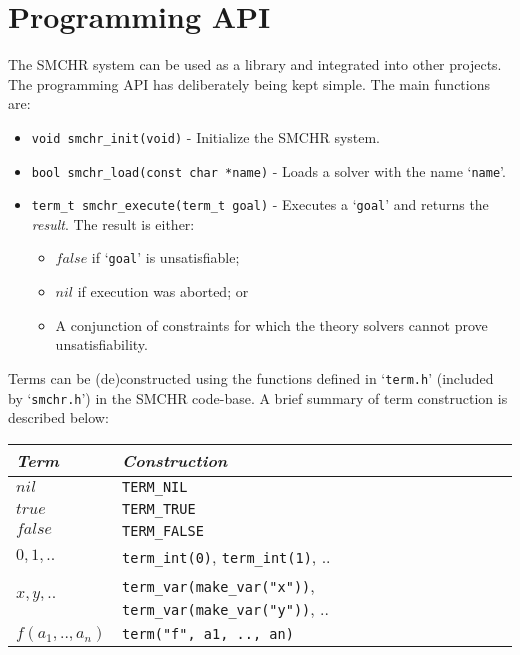 \documentclass{article}
\begin{document}
\section{Programming API}

The SMCHR system can be used as a library and integrated into other projects.
The programming API has deliberately being kept simple.
The main functions are:
\begin{itemize}[noitemsep,topsep=0pt,parsep=0pt,partopsep=0pt]
\item \verb+void smchr_init(void)+ -
    Initialize the SMCHR system.
\item \verb+bool smchr_load(const char *name)+ -
    Loads a solver with the name `\texttt{name}'.
\item \verb+term_t smchr_execute(term_t goal)+ -
    Executes a `\texttt{goal}' and returns the \emph{result}.
    The result is either:
    \begin{itemize}
        \item $\mathit{false}$ if `\texttt{goal}' is unsatisfiable;
        \item $\mathit{nil}$ if execution was aborted; or
        \item A conjunction of constraints for which the theory solvers
              cannot prove unsatisfiability.
    \end{itemize}
\end{itemize}
Terms can be (de)constructed using the functions defined in `\verb+term.h+'
(included by `\verb+smchr.h+') in the SMCHR code-base.
A brief summary of term construction is described below:
\begin{center}
\begin{tabular}{|l|l|}
\hline
\emph{Term} & \emph{Construction} \\
\hline
\hline
$\mathit{nil}$ & \verb+TERM_NIL+ \\
$\mathit{true}$ & \verb+TERM_TRUE+ \\
$\mathit{false}$ & \verb+TERM_FALSE+ \\
$0, 1, ..$ & \verb+term_int(0)+, \verb+term_int(1)+, $..$ \\
$x, y, ..$ & \verb+term_var(make_var("x"))+, \verb+term_var(make_var("y"))+,
    $..$ \\
$f(a_1, .., a_n)$ & \verb+term("f", a1, .., an)+ \\
\hline
\end{tabular}
\end{center}
\end{document}
